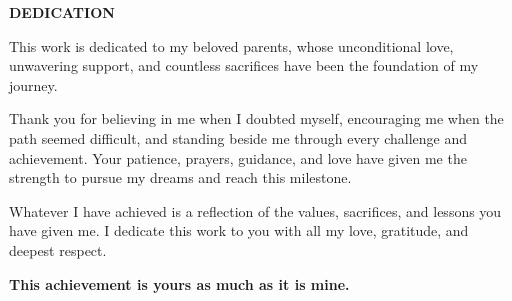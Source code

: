 
\begin{center}
	{\Large\bfseries DEDICATION}
\end{center}

This work is dedicated to my beloved parents, whose unconditional love, unwavering support, and countless sacrifices have been the foundation of my journey.

\vspace{0.5cm}

Thank you for believing in me when I doubted myself, encouraging me when the path seemed difficult, and standing beside me through every challenge and achievement. Your patience, prayers, guidance, and love have given me the strength to pursue my dreams and reach this milestone.

\vspace{0.5cm}

Whatever I have achieved is a reflection of the values, sacrifices, and lessons you have given me. I dedicate this work to you with all my love, gratitude, and deepest respect.

\vspace{0.8cm}

\textbf{This achievement is yours as much as it is mine.}

\clearpage